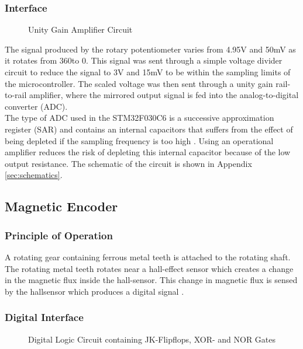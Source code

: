 \subsubsection{Interface}
\begin{figure}[h]
	\centering
	
	\caption{Unity Gain Amplifier Circuit}
	\label{fig:unitygain}
\end{figure}
The signal produced by the rotary potentiometer varies from 4.95V and 50mV as it rotates from 360\textdegree \space to 0\textdegree. This signal was sent through a simple voltage divider circuit to reduce the signal to 3V and 15mV to be within the sampling limits of the microcontroller. The scaled voltage was then sent through a unity gain rail-to-rail amplifier, where the mirrored output signal is fed into the analog-to-digital converter (ADC).\\

The type of ADC used in the STM32F030C6 is a successive approximation register (SAR) and contains an internal capacitors that suffers from the effect of being depleted if the sampling frequency is too high \citep{stm32_ADC:2017}. Using an operational amplifier reduces the risk of depleting this internal capacitor because of the low output resistance. The schematic of the circuit is shown in Appendix \ref{sec:schematics}.\\

\subsection{Magnetic Encoder}
\subsubsection{Principle of Operation}
A rotating gear containing ferrous metal teeth is attached to the rotating shaft. The rotating metal teeth rotates near a hall-effect sensor which creates a change in the magnetic flux inside the hall-sensor. This change in magnetic flux is sensed by the hallsensor which produces a digital signal \citep{hallsensor}.
\subsubsection{Digital Interface} 

\begin{figure}[h]
	\centering
	
	\caption{Digital Logic Circuit containing JK-Flipflops, XOR- and NOR Gates}
	\label{fig:jk_xor}
\end{figure}

